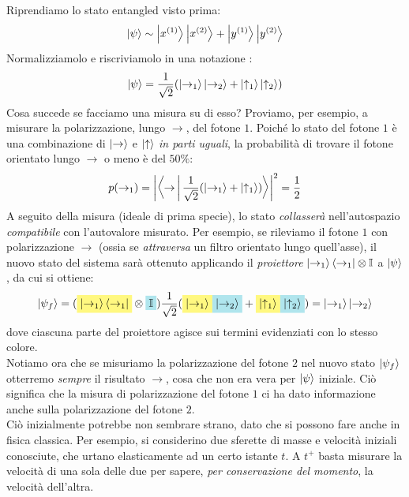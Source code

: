 \documentclass[../../FisicaTeorica.tex]{subfiles}
\begin{document}
\begin{oss}
Riprendiamo lo stato entangled visto prima:
\[
\Ket{\psi}\sim
\Ket{x^{(1)}}\Ket{x^{(2)}} + \Ket{y^{(1)}}\Ket{y^{(2)}}
\]
Normalizziamolo e riscriviamolo in una notazione :
\begin{align*}
\Ket{\psi}= \frac{1}{\sqrt{2}}(
\Ket{\rightarrow_1}\Ket{\rightarrow_2}+\Ket{\uparrow_1}\Ket{\uparrow_2})
\end{align*}
Cosa succede se facciamo una misura su di esso? Proviamo, per esempio, a misurare la polarizzazione, lungo $\rightarrow$, del fotone $1$. Poiché lo stato del fotone $1$ è una combinazione di $\Ket{\rightarrow}$ e $\Ket{\uparrow}$ \textit{in parti uguali}, la probabilità di trovare il fotone orientato lungo $\rightarrow$ o meno è del $50\%$:
\begin{align*}
p(\rightarrow_1)= \left|\Braket{\rightarrow|\frac{1}{\sqrt{2}}(\Ket{\rightarrow_1}+\Ket{\uparrow_1})}\right|^2 = \frac{1}{2}
\end{align*}
A seguito della misura (ideale di prima specie), lo stato \textit{collasserà} nell'autospazio \textit{compatibile} con l'autovalore misurato. Per esempio, se rileviamo il fotone $1$ con polarizzazione $\rightarrow$ (ossia se \textit{attraversa} un filtro orientato lungo quell'asse), il nuovo stato del sistema sarà ottenuto applicando il \textit{proiettore} $\Ket{\rightarrow_1}\Bra{\rightarrow_1} \otimes \mathbb{I}$ a $\Ket{\psi}$, da cui si ottiene:
\begin{align*}
\ket{\psi_f} = (\hlc{Yellow}{\ket{\rightarrow_1}\bra{\rightarrow_1}}  \otimes \hlc{SkyBlue}{\bb{I}}) \frac{1}{\sqrt{2}}(\hlc{Yellow}{
\ket{\rightarrow_1}}\hlc{SkyBlue}{\ket{\rightarrow_2}}+\hlc{Yellow}{\ket{\uparrow_1}}\hlc{SkyBlue}{\ket{\uparrow_2}}) = \ket{\rightarrow_1}\ket{\rightarrow_2}
\end{align*}
dove ciascuna parte del proiettore agisce sui termini evidenziati con lo stesso colore.\\
Notiamo ora che se misuriamo la polarizzazione del fotone $2$ nel nuovo stato $\Ket{\psi_f}$ otterremo \textit{sempre} il risultato $\rightarrow$, cosa che non era vera per $\Ket{\psi}$ iniziale. Ciò significa che la misura di polarizzazione del fotone $1$ ci ha dato informazione anche sulla polarizzazione del fotone $2$.\\

Ciò inizialmente potrebbe non sembrare strano, dato che  si possono fare anche in fisica classica. Per esempio, si considerino due sferette di masse e velocità iniziali conosciute, che urtano elasticamente ad un certo istante $t$. A $t^+$ basta misurare la velocità di una sola delle due per sapere, \textit{per conservazione del momento}, la velocità dell'altra.\\


\end{oss}
\end{document}
